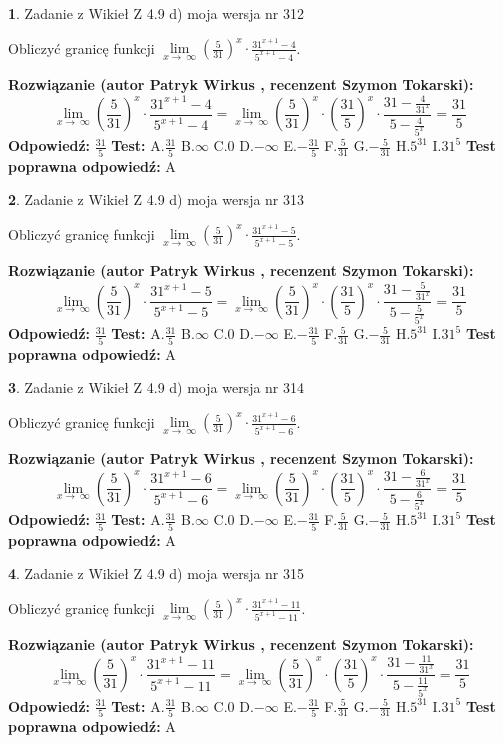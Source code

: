 \documentclass[12pt, a4paper]{article}
\theoremstyle{definition} %
\newtheorem{zad}{}
\newcommand{\zadStart}[1]{\begin{zad}#1\newline}
\newcommand{\zadStop}{\end{zad}}
\newcommand{\rozwStart}[2]{\noindent \textbf{Rozwiązanie (autor #1 , recenzent #2): }\newline}
\newcommand{\rozwStop}{\newline}
\newcommand{\odpStart}{\noindent \textbf{Odpowiedź:}\newline}
\newcommand{\odpStop}{\newline}
\newcommand{\testStart}{\noindent \textbf{Test:}\newline}
\newcommand{\testStop}{\newline}
\newcommand{\kluczStart}{\noindent \textbf{Test poprawna odpowiedź:}\newline}
\newcommand{\kluczStop}{\newline}
\begin{document}
\zadStart{Zadanie z Wikieł Z 4.9 d) moja wersja nr 312}


Obliczyć granicę funkcji  $\lim\limits_{x\to\ \infty}(\frac{5}{31})^{x}\cdot\frac{31^{x+1}-4}{5^{x+1}-4}$.
\zadStop
\rozwStart{Patryk Wirkus}{Szymon Tokarski}
$$\lim\limits_{x\to\ \infty}(\frac{5}{31})^{x}\cdot\frac{31^{x+1}-4}{5^{x+1}-4}=\lim\limits_{x\to\ \infty}(\frac{5}{31})^{x}\cdot(\frac{31}{5})^{x} \cdot \frac{31-\frac{4}{31^{x}}}{5-\frac{4}{5^{x}}} = \frac{31}{5}$$
\rozwStop
\odpStart
$\frac{31}{5}$
\odpStop
\testStart
A.$\frac{31}{5}$ B.$\infty$ C.$0$ D.$-\infty$ E.$-\frac{31}{5}$
F.$\frac{5}{31}$ G.$-\frac{5}{31}$
H.$5^{31}$
I.$31^{5}$
\testStop
\kluczStart
A
\kluczStop



\zadStart{Zadanie z Wikieł Z 4.9 d) moja wersja nr 313}


Obliczyć granicę funkcji  $\lim\limits_{x\to\ \infty}(\frac{5}{31})^{x}\cdot\frac{31^{x+1}-5}{5^{x+1}-5}$.
\zadStop
\rozwStart{Patryk Wirkus}{Szymon Tokarski}
$$\lim\limits_{x\to\ \infty}(\frac{5}{31})^{x}\cdot\frac{31^{x+1}-5}{5^{x+1}-5}=\lim\limits_{x\to\ \infty}(\frac{5}{31})^{x}\cdot(\frac{31}{5})^{x} \cdot \frac{31-\frac{5}{31^{x}}}{5-\frac{5}{5^{x}}} = \frac{31}{5}$$
\rozwStop
\odpStart
$\frac{31}{5}$
\odpStop
\testStart
A.$\frac{31}{5}$ B.$\infty$ C.$0$ D.$-\infty$ E.$-\frac{31}{5}$
F.$\frac{5}{31}$ G.$-\frac{5}{31}$
H.$5^{31}$
I.$31^{5}$
\testStop
\kluczStart
A
\kluczStop



\zadStart{Zadanie z Wikieł Z 4.9 d) moja wersja nr 314}


Obliczyć granicę funkcji  $\lim\limits_{x\to\ \infty}(\frac{5}{31})^{x}\cdot\frac{31^{x+1}-6}{5^{x+1}-6}$.
\zadStop
\rozwStart{Patryk Wirkus}{Szymon Tokarski}
$$\lim\limits_{x\to\ \infty}(\frac{5}{31})^{x}\cdot\frac{31^{x+1}-6}{5^{x+1}-6}=\lim\limits_{x\to\ \infty}(\frac{5}{31})^{x}\cdot(\frac{31}{5})^{x} \cdot \frac{31-\frac{6}{31^{x}}}{5-\frac{6}{5^{x}}} = \frac{31}{5}$$
\rozwStop
\odpStart
$\frac{31}{5}$
\odpStop
\testStart
A.$\frac{31}{5}$ B.$\infty$ C.$0$ D.$-\infty$ E.$-\frac{31}{5}$
F.$\frac{5}{31}$ G.$-\frac{5}{31}$
H.$5^{31}$
I.$31^{5}$
\testStop
\kluczStart
A
\kluczStop



\zadStart{Zadanie z Wikieł Z 4.9 d) moja wersja nr 315}


Obliczyć granicę funkcji  $\lim\limits_{x\to\ \infty}(\frac{5}{31})^{x}\cdot\frac{31^{x+1}-11}{5^{x+1}-11}$.
\zadStop
\rozwStart{Patryk Wirkus}{Szymon Tokarski}
$$\lim\limits_{x\to\ \infty}(\frac{5}{31})^{x}\cdot\frac{31^{x+1}-11}{5^{x+1}-11}=\lim\limits_{x\to\ \infty}(\frac{5}{31})^{x}\cdot(\frac{31}{5})^{x} \cdot \frac{31-\frac{11}{31^{x}}}{5-\frac{11}{5^{x}}} = \frac{31}{5}$$
\rozwStop
\odpStart
$\frac{31}{5}$
\odpStop
\testStart
A.$\frac{31}{5}$ B.$\infty$ C.$0$ D.$-\infty$ E.$-\frac{31}{5}$
F.$\frac{5}{31}$ G.$-\frac{5}{31}$
H.$5^{31}$
I.$31^{5}$
\testStop
\kluczStart
A
\kluczStop
\end{document}
